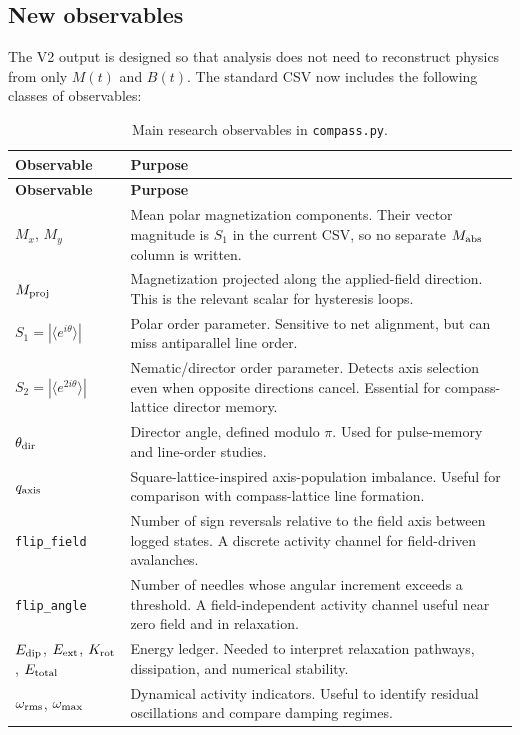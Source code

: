 \documentclass[11pt,a4paper]{article}
\newcommand{\code}[1]{\texttt{#1}}
\begin{document}
\subsection{New observables}

The V2 output is designed so that analysis does not need to reconstruct physics from only $M(t)$ and $B(t)$. The standard CSV now includes the following classes of observables:

\begin{longtable}{@{}p{4.2cm}p{10.6cm}@{}}
\caption{Main research observables in \code{compass.py}.}\label{tab:v2obs}\\
\toprule
\textbf{Observable} & \textbf{Purpose}\\
\midrule
\endfirsthead
\toprule
\textbf{Observable} & \textbf{Purpose}\\
\midrule
\endhead
\bottomrule
\endfoot
$M_x$, $M_y$ & Mean polar magnetization components. Their vector magnitude is $S_1$ in the current CSV, so no separate $M_{\rm abs}$ column is written.\\
$M_{\rm proj}$ & Magnetization projected along the applied-field direction. This is the relevant scalar for hysteresis loops.\\
$S_1=|\langle e^{i\theta}\rangle|$ & Polar order parameter. Sensitive to net alignment, but can miss antiparallel line order.\\
$S_2=|\langle e^{2i\theta}\rangle|$ & Nematic/director order parameter. Detects axis selection even when opposite directions cancel. Essential for compass-lattice director memory.\\
$\theta_{\rm dir}$ & Director angle, defined modulo $\pi$. Used for pulse-memory and line-order studies.\\
$q_{\rm axis}$ & Square-lattice-inspired axis-population imbalance. Useful for comparison with compass-lattice line formation.\\
\code{flip\_field} & Number of sign reversals relative to the field axis between logged states. A discrete activity channel for field-driven avalanches.\\
\code{flip\_angle} & Number of needles whose angular increment exceeds a threshold. A field-independent activity channel useful near zero field and in relaxation.\\
$E_{\rm dip}$, $E_{\rm ext}$, $K_{\rm rot}$, $E_{\rm total}$ & Energy ledger. Needed to interpret relaxation pathways, dissipation, and numerical stability.\\
$\omega_{\rm rms}$, $\omega_{\rm max}$ & Dynamical activity indicators. Useful to identify residual oscillations and compare damping regimes.\\
\end{longtable}
\end{document}
